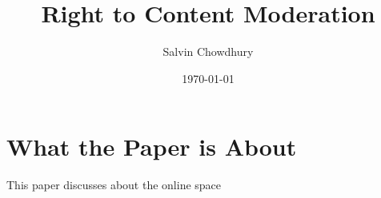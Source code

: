 \documentclass[a4paper]{article}
\title{Right to Content Moderation}
\author{Salvin Chowdhury}
\date{\today}
\begin{document}
\maketitle

\newpage

\section{What the Paper is About}
This paper discusses about the online space 
\end{document}
